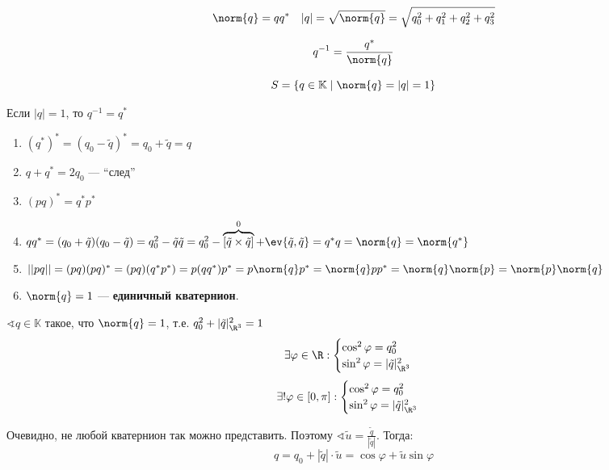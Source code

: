 \begin{definition}
	\[\norm{q} = q q^* \quad |q| = \sqrt{\norm{q}} = \sqrt{q_0^2 + q_1^2 + q_2^2 + q_3^2} \]
\end{definition}

\begin{definition}
	\[q^{-1} = \frac{q^*}{\norm{q}}\]
\end{definition}

\begin{definition}
	\[S = \{q \in \mathbb{K} \mid \norm{q} = |q| = 1\}\]
\end{definition}

\begin{remark}
	Если \(|q| = 1\), то  \(q^{-1} = q^*\)
\end{remark}

\begin{prop}\itemfix
	\begin{enumerate}
		\item $(q^*)^* = (q_0 - \tilde{q})^* = q_0 + \tilde{q} = q$
		\item $q + q^* = 2 q_0$ --- ``след''
		\item $(pq)^* = q^* p^*$
		\item $q q^* = (q_0 + \tilde{q}) (q_0 - \tilde{q}) = q_0^2 - \tilde{q} \tilde{q} = q_0^2 - \overbrace{[\tilde{q} \times \tilde{q}]}^0 + \ev{\tilde{q}, \tilde{q}} = q^* q = \norm{q} = \norm{q^*}$
		\item $||pq|| = (pq)(pq)^* = (pq) (q^* p^*) = p (qq^*) p^* = p \norm{q} p^* = \norm{q} p p^* = \norm{q} \norm{p} = \norm{p} \norm{q}$
		\item $\norm{q} = 1$ --- \textbf{единичный кватернион}.
	\end{enumerate}
\end{prop}

\(\sphericalangle q \in \mathbb{K}\) такое, что \(\norm{q} = 1\), т.е. \(q_0^2 + |\tilde{q}|^2_{\R^3} = 1\)
\[\exists \varphi \in \R : \begin{cases}
		\cos^2 \varphi = q_0^2 \\
		\sin^2 \varphi = |\tilde{q}|^2_{\R^3}
	\end{cases}\]
\[\exists! \varphi \in [0, \pi] : \begin{cases}
		\cos^2 \varphi = q_0^2 \\
		\sin^2 \varphi = |\tilde{q}|^2_{\R^3}
	\end{cases}\]

Очевидно, не любой кватернион так можно представить. Поэтому \(\sphericalangle \tilde{u} = \frac{\tilde{q}}{|\tilde{q}|}\). Тогда:
\[q = q_0 + |\tilde{q}| \cdot \tilde{u} = \cos \varphi + \tilde{u} \sin \varphi\]

